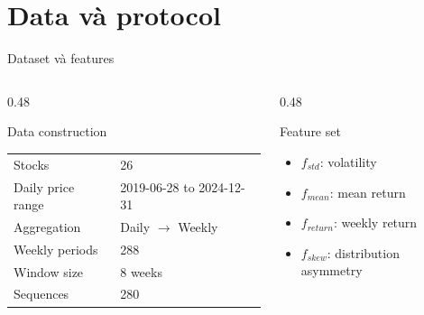 \documentclass[aspectratio=169,11pt,t]{beamer}
\newcommand{\NumStocks}{26}
\newcommand{\DateRange}{2019-06-28 to 2024-12-31}
\newcommand{\WeeklyPeriods}{288}
\newcommand{\WindowSize}{8}
\newcommand{\NumSequences}{280}
\begin{document}
\section{Data và protocol}
\begin{frame}{Dataset và features}
\begin{columns}[T,totalwidth=\textwidth]
\begin{column}{0.48\textwidth}
\begin{block}{Data construction}
\begin{tabular}{@{}ll@{}}
\toprule
Stocks & \NumStocks{} \\
Daily price range & \DateRange{} \\
Aggregation & Daily $\rightarrow$ Weekly \\
Weekly periods & \WeeklyPeriods{} \\
Window size & \WindowSize{} weeks \\
Sequences & \NumSequences{} \\
\bottomrule
\end{tabular}
\end{block}
\end{column}
\begin{column}{0.48\textwidth}
\begin{block}{Feature set}
\begin{itemize}
  \item $f_{std}$: volatility
  \item $f_{mean}$: mean return 
  \item $f_{return}$: weekly return 
  \item $f_{skew}$: distribution asymmetry
\end{itemize}
\end{block}
\end{column}
\end{columns}

\end{frame}
\end{document}
